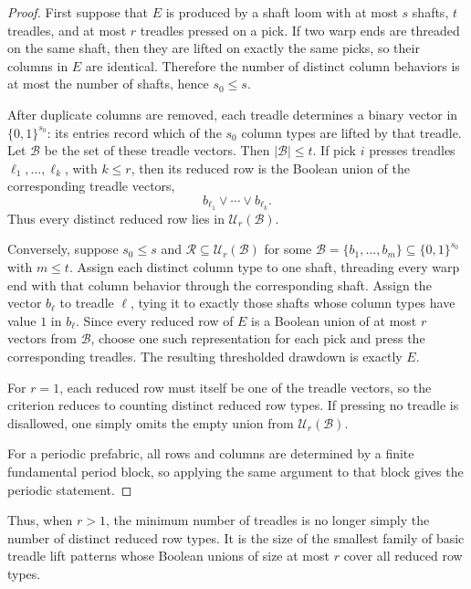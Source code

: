 \documentclass[11pt]{article}
\begin{document}
\begin{proof}
First suppose that \(E\) is produced by a shaft loom with at most \(s\) shafts,
\(t\) treadles, and at most \(r\) treadles pressed on a pick. If two warp ends
are threaded on the same shaft, then they are lifted on exactly the same picks,
so their columns in \(E\) are identical. Therefore the number of distinct column
behaviors is at most the number of shafts, hence \(s_0\le s\).

After duplicate columns are removed, each treadle determines a binary vector in
\(\{0,1\}^{s_0}\): its entries record which of the \(s_0\) column types are
lifted by that treadle. Let \(\mathcal{B}\) be the set of these treadle vectors.
Then \(|\mathcal{B}|\le t\). If pick \(i\) presses treadles
\(\ell_1,\dots,\ell_k\), with \(k\le r\), then its reduced row is the Boolean union
of the corresponding treadle vectors,
\[
  b_{\ell_1}\vee\cdots\vee b_{\ell_k}.
\]
Thus every distinct reduced row lies in \(\mathcal{U}_r(\mathcal{B})\).

Conversely, suppose \(s_0\le s\) and
\(\mathcal{R}\subseteq\mathcal{U}_r(\mathcal{B})\) for some
\(\mathcal{B}=\{b_1,\dots,b_m\}\subseteq\{0,1\}^{s_0}\) with \(m\le t\).
Assign each distinct column type to one shaft, threading every warp end with
that column behavior through the corresponding shaft. Assign the vector
\(b_\ell\) to treadle \(\ell\), tying it to exactly those shafts whose column types
have value \(1\) in \(b_\ell\). Since every reduced row of \(E\) is a Boolean union
of at most \(r\) vectors from \(\mathcal{B}\), choose one such representation
for each pick and press the corresponding treadles. The resulting thresholded
drawdown is exactly \(E\).

For \(r=1\), each reduced row must itself be one of the treadle vectors, so the
criterion reduces to counting distinct reduced row types. If pressing no treadle
is disallowed, one simply omits the empty union from
\(\mathcal{U}_r(\mathcal{B})\).

For a periodic prefabric, all rows and columns are determined by a finite
fundamental period block, so applying the same argument to that block gives the
periodic statement.
\end{proof}

Thus, when \(r>1\), the minimum number of treadles is no longer simply the
number of distinct reduced row types. It is the size of the smallest family of
basic treadle lift patterns whose Boolean unions of size at most \(r\) cover all
reduced row types.
\end{document}
